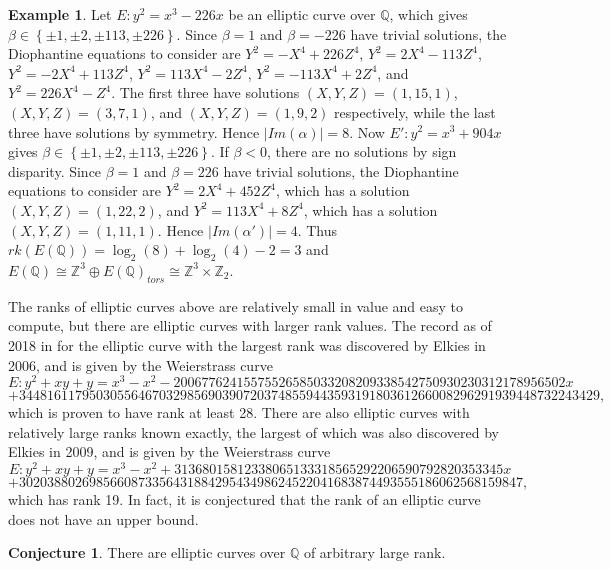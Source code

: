 \documentclass{article}
\newcommand{\Z}{\mathbb{Z}}
\newcommand{\Q}{\mathbb{Q}}
\newcommand{\rb}[1]{\left( #1 \right)}
\newcommand{\cb}[1]{\left\{ #1 \right\}}
\newcommand{\abs}[1]{\left\lvert #1 \right\rvert}
\theoremstyle{definition}
\newtheorem*{example}{Example}
\newtheorem{conjecture}[proposition]{Conjecture}
\begin{document}
\begin{example}
Let $ E : y^2 = x^3 - 226x $ be an elliptic curve over $ \Q $, which gives $ \beta \in \cb{\pm 1, \pm 2, \pm 113, \pm 226} $. Since $ \beta = 1 $ and $ \beta = -226 $ have trivial solutions, the Diophantine equations to consider are $ Y^2 = -X^4 + 226Z^4 $, $ Y^2 = 2X^4 - 113Z^4 $, $ Y^2 = -2X^4 + 113Z^4 $, $ Y^2 = 113X^4 - 2Z^4 $, $ Y^2 = -113X^4 + 2Z^4 $, and $ Y^2 = 226X^4 - Z^4 $. The first three have solutions $ \rb{X, Y, Z} = \rb{1, 15, 1} $, $ \rb{X, Y, Z} = \rb{3, 7, 1} $, and $ \rb{X, Y, Z} = \rb{1, 9, 2} $ respectively, while the last three have solutions by symmetry. Hence $ \abs{Im\rb{\alpha}} = 8 $. Now $ E' : y^2 = x^3 + 904x $ gives $ \beta \in \cb{\pm 1, \pm 2, \pm 113, \pm 226} $. If $ \beta < 0 $, there are no solutions by sign disparity. Since $ \beta = 1 $ and $ \beta = 226 $ have trivial solutions, the Diophantine equations to consider are $ Y^2 = 2X^4 + 452Z^4 $, which has a solution $ \rb{X, Y, Z} = \rb{1, 22, 2} $, and $ Y^2 = 113X^4 + 8Z^4 $, which has a solution $ \rb{X, Y, Z} = \rb{1, 11, 1} $. Hence $ \abs{Im\rb{\alpha'}} = 4 $. Thus $ rk\rb{E\rb{\Q}} = \log_2\rb{8} + \log_2\rb{4} - 2 = 3 $ and $ E\rb{\Q} \cong \Z^3 \oplus E\rb{\Q}_{tors} \cong \Z^3 \times \Z_2 $.
\end{example}

The ranks of elliptic curves above are relatively small in value and easy to compute, but there are elliptic curves with larger rank values. The record as of 2018 in \cite{rankhistory} for the elliptic curve with the largest rank was discovered by Elkies in 2006, and is given by the Weierstrass curve
$$ E : y^2 + xy + y = x^3 - x^2 - 20067762415575526585033208209338542750930230312178956502x $$
$$ + 34481611795030556467032985690390720374855944359319180361266008296291939448732243429, $$
which is proven to have rank at least 28. There are also elliptic curves with relatively large ranks known exactly, the largest of which was also discovered by Elkies in 2009, and is given by the Weierstrass curve
$$ E : y^2 + xy + y = x^3 - x^2 + 31368015812338065133318565292206590792820353345x $$
$$ + 302038802698566087335643188429543498624522041683874493555186062568159847, $$
which has rank 19. In fact, it is conjectured that the rank of an elliptic curve does not have an upper bound.

\begin{conjecture}
There are elliptic curves over $ \Q $ of arbitrary large rank.
\end{conjecture}
\end{document}
